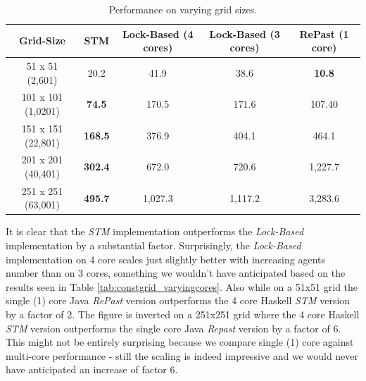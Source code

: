 \begin{table}
	\centering
  	\begin{tabular}{ c || c | c | c | c }
        Grid-Size          & STM              & Lock-Based (4 cores) & Lock-Based (3 cores) & RePast (1 core) \\ \hline \hline 
   		51 x 51 (2,601)    & 20.2             & 41.9                 & 38.6                 & \textbf{10.8}   \\ \hline
   		101 x 101 (1,0201) & \textbf{74.5}    & 170.5                & 171.6                & 107.40          \\ \hline
   		151 x 151 (22,801) & \textbf{168.5}   & 376.9                & 404.1                & 464.1           \\ \hline
   		201 x 201 (40,401) & \textbf{302.4}   & 672.0                & 720.6                & 1,227.7         \\ \hline
   		251 x 251 (63,001) & \textbf{495.7}   & 1,027.3              & 1,117.2              & 3,283.6         \\ \hline \hline
  	\end{tabular}

  	\caption{Performance on varying grid sizes.}
	\label{tab:varyinggrid_constcores}
\end{table}

It is clear that the \textit{STM} implementation outperforms the \textit{Lock-Based} implementation by a substantial factor. Surprisingly, the \textit{Lock-Based} implementation on 4 core scales just slightly better with increasing agents number than on 3 cores, something we wouldn't have anticipated based on the results seen in Table \ref{tab:constgrid_varyingcores}. Also  while on a 51x51 grid the single (1) core Java \textit{RePast} version outperforms the 4 core Haskell \textit{STM} version by a factor of 2. The figure is inverted on a 251x251 grid where the 4 core Haskell \textit{STM} version outperforms the single core Java \textit{Repast} version by a factor of 6. This might not be entirely surprising because we compare single (1) core against multi-core performance - still the scaling is indeed impressive and we would never have anticipated an increase of factor 6.

